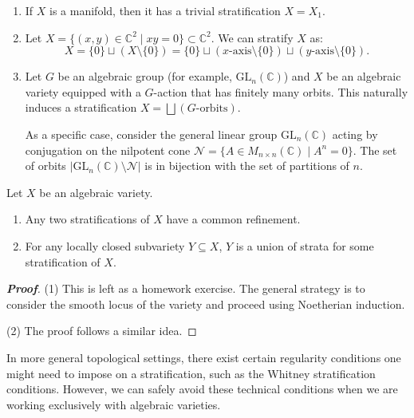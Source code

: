 \begin{example}
    \begin{enumerate}
    \item If $X$ is a manifold, then it has a trivial stratification $X = X_1$.
    \item Let $X = \{(x,y) \in \mathbb{C}^2 \mid xy = 0\} \subset \mathbb{C}^2$. We can stratify $X$ as:
    \[ X = \{0\} \sqcup (X \setminus \{0\}) = \{0\} \sqcup (\text{$x$-axis} \setminus \{0\}) \sqcup (\text{$y$-axis} \setminus \{0\}). \]
    \item Let $G$ be an algebraic group (for example, $\mathrm{GL}_n(\mathbb{C})$) and $X$ be an algebraic variety equipped with a $G$-action that has finitely many orbits. This naturally induces a stratification $X = \bigsqcup (\text{$G$-orbits})$. 
    
    As a specific case, consider the general linear group $\mathrm{GL}_n(\mathbb{C})$ acting by conjugation on the nilpotent cone $\mathcal{N} = \{A \in M_{n \times n}(\mathbb{C}) \mid A^n = 0\}$. The set of orbits $|\mathrm{GL}_n(\mathbb{C}) \setminus \mathcal{N}|$ is in bijection with the set of partitions of $n$. 
\end{enumerate}
\end{example}

\begin{lemma}
Let $X$ be an algebraic variety.
\begin{enumerate}
    \item Any two stratifications of $X$ have a common refinement.
    \item For any locally closed subvariety $Y \subseteq X$, $Y$ is a union of strata for some stratification of $X$.
\end{enumerate}
\end{lemma}

\begin{proof}[\textbf{Proof}]
(1) This is left as a homework exercise. The general strategy is to consider the smooth locus of the variety and proceed using Noetherian induction.

(2) The proof follows a similar idea.
\end{proof}

\begin{remark}
    In more general topological settings, there exist certain regularity conditions one might need to impose on a stratification, such as the Whitney stratification conditions. However, we can safely avoid these technical conditions when we are working exclusively with algebraic varieties.
\end{remark}

